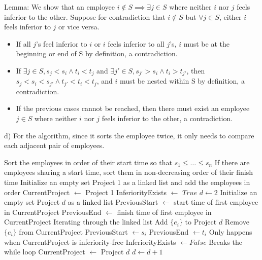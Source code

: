 \documentclass[11pt]{article}
\begin{document}
Lemma: We show that an employee $i\notin S \implies \exists j\in S$ where neither $i$ nor $j$ feels inferior to the other. Suppose for contradiction that $i\notin S$ but $\forall j\in S$, either $i$ feels inferior to $j$ or vice versa.

\begin{itemize}
    \item If all $j$'s feel inferior to $i$ or $i$ feels inferior to all $j$'s, $i$ must be at the beginning or end of S by definition, a contradiction.
    \item If $\exists j\in S, s_j<s_i \land t_i<t_j$ and $\exists j'\in S, s_{j'}>s_i \land t_i>t_{j'}$, then $s_j<s_i<s_{j'} \land t_{j'}<t_i<t_j$, and $i$ must be nested within S by definition, a contradiction.
    \item If the previous cases cannot be reached, then there must exist an employee $j\in S$ where neither $i$ nor $j$ feels inferior to the other, a contradiction.
\end{itemize}

d) For the algorithm, since it sorts the employee twice, it only needs to compare each adjacent pair of employees.

\begin{algorithm}[H]
\caption{Project Division}
\begin{algorithmic}[1]
\State Sort the employees in order of their start time so that $s_1 \leq \ldots \leq s_n$
\State If there are employees sharing a start time, sort them in non-decreasing order of their finish time
\State Initialize an empty set Project 1 as a linked list and add the employees in order
\State CurrentProject $\gets$ Project 1
\State InferiorityExists $\gets$ $True$
\State $d \gets 2$
\State Initialize an empty set Project $d$ as a linked list
\State PreviousStart $\gets$ start time of first employee in CurrentProject
\State PreviousEnd $\gets$ finish time of first employee in CurrentProject
 \Comment Iterating through the linked list
    \State Add $\{e_i\}$ to Project $d$
    \State Remove $\{e_i\}$ from CurrentProject
\Else
    \State PreviousStart $\gets s_{i}$
    \State PreviousEnd $\gets t_{i}$
\EndIf
\EndFor
{}
\Comment Only happens when CurrentProject is inferiority-free
\State InferiorityExists $\gets False$
\Comment Breaks the while loop
\Else
    \State CurrentProject $\gets$ Project $d$
    \State $d \gets d + 1$
\EndIf
\EndWhile
\end{algorithmic}
\end{algorithm}
\end{document}
